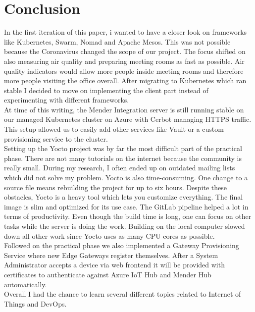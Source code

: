 \section{Conclusion}
In the first iteration of this paper, i wanted to have a closer look on frameworks like Kubernetes, Swarm, Nomad and Apache Mesos. This was not possible because the Coronavirus changed the scope of our project. The focus shifted on also measuring air quality and preparing meeting rooms as fast as possible. Air quality indicators would allow more people inside meeting rooms and therefore more people visiting the office overall. After migrating to Kubernetes which ran stable I decided to move on implementing the client part instead of experimenting with different frameworks.\\
At time of this writing, the Mender Integration server is still running stable on our managed Kubernetes cluster on Azure with Cerbot managing HTTPS traffic. This setup allowed us to easily add other services like Vault or a custom provisioning service to the cluster.\\
Setting up the Yocto project was by far the most difficult part of the practical phase. There are not many tutorials on the internet because the community is really small. During my research, I often ended up on outdated mailing lists which did not solve my problem. Yocto is also time-consuming. One change to a source file means rebuilding the project for up to six hours. Despite these obstacles, Yocto is a heavy tool which lets you customize everything. The final image is slim and optimized for its use case. The GitLab pipeline helped a lot in terms of productivity. Even though the build time is long, one can focus on other tasks while the server is doing the work. Building on the local computer slowed down all other work since Yocto uses as many CPU cores as possible.\\
Followed on the practical phase we also implemented a Gateway Provisioning Service where new Edge Gateways register themselves. After a System Administrator accepts a device via web frontend it will be provided with certificates to authenticate against Azure IoT Hub and Mender Hub automatically.\\
Overall I had the chance to learn several different topics related to Internet of Things and DevOps.
\newpage
